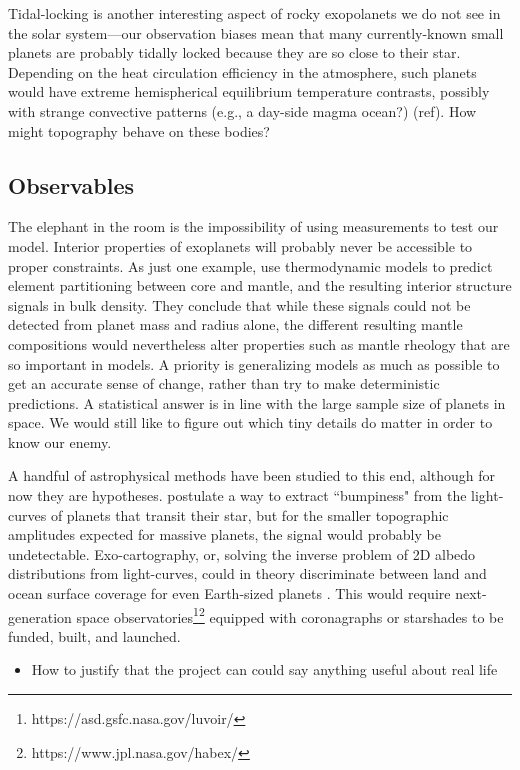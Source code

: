 Tidal-locking is another interesting aspect of rocky exopolanets we do not see in the solar system---our observation biases mean that many currently-known small planets are probably tidally locked because they are so close to their star. Depending on the heat circulation efficiency in the atmosphere, such planets would have extreme hemispherical equilibrium temperature contrasts, possibly with strange convective patterns (e.g., a day-side magma ocean?) (ref). How might topography behave on these bodies? 





\subsection{Observables}

The elephant in the room is the impossibility of using measurements to test our model. Interior properties of exoplanets will probably never be accessible to proper constraints. As just one example, \citet{Schaefer2017} use thermodynamic models to predict element partitioning between core and mantle, and the resulting interior structure signals in bulk density. They conclude that while these signals could not be detected from planet mass and radius alone, the different resulting mantle compositions would nevertheless alter properties such as mantle rheology that are so important in models. A priority is generalizing models as much as possible to get an accurate sense of change, rather than try to make deterministic predictions. A statistical answer is in line with the large sample size of planets in space. We would still like to figure out which tiny details do matter in order to know our enemy.

A handful of astrophysical methods have been studied to this end, although for now they are hypotheses. \citet{McTier2018} postulate a way to extract ``bumpiness" from the light-curves of planets that transit their star, but for the smaller topographic amplitudes expected for massive planets, the signal would probably be undetectable. Exo-cartography, or, solving the inverse problem of 2D albedo distributions from light-curves, could in theory discriminate between land and ocean surface coverage for even Earth-sized planets \citep{Cowan2018, Farr2018, Kawahara2020, Aizawa2020}. This would require next-generation space observatories\footnote{https://asd.gsfc.nasa.gov/luvoir/}\footnote{https://www.jpl.nasa.gov/habex/} equipped with coronagraphs or starshades to be funded, built, and launched.

\begin{itemize}
\item How to justify that the project can could say anything useful about real life
\end{itemize} 

